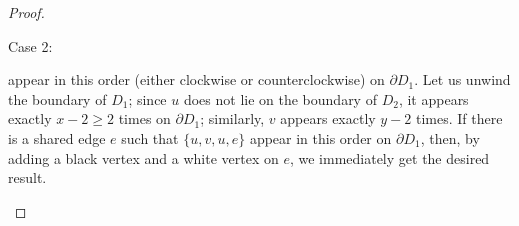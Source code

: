 \begin{proof}
\begin{sideline}{Case 2:}
\begin{center}
\end{center}
appear in this order (either clockwise or counterclockwise) on $\partial D_1$. Let us unwind the boundary of $D_1$; since $u$ does not lie on the boundary of $D_2$, it appears exactly $x-2\ge 2$ times on $\partial D_1$; similarly, $v$ appears exactly $y-2$ times.
\def\myradius{1.3cm}
If there is a shared edge $e$ such that $\{u,v,u,e\}$ appear in this order on $\partial D_1$, then, by adding a black vertex and a white vertex on $e$, we immediately get the desired result.
\begin{center}
\def\picturesetupbase{
\begin{pgfonlayer}{graph edge below}
\fill[disk 1,postaction={draw,surf boundary}] circle(1);
\end{pgfonlayer}
}
\def\picturesetup{
\picturesetupbase
\path (0:1) pic{black vertex} node[right] {$u$};
\path (180:1) pic {black vertex} node[left] {$u$};
\path (-90:1) pic {white vertex} node[below] {$v$};
\path[graph edge={below}{green edge}] (45:1) arc (45:135:1);
}
\end{center}


\end{sideline}
\end{proof}
